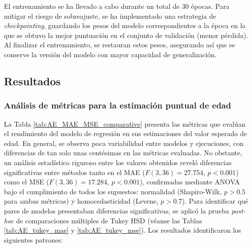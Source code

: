 El entrenamiento se ha llevado a cabo durante un total de 30 épocas. Para mitigar el riesgo de sobreajuste, se ha implementado una estrategia de \textit{checkpointing}, guardando los pesos del modelo correspondientes a la época en la que se obtuvo la mejor puntuación en el conjunto de validación (menor pérdida). Al finalizar el entrenamiento, se restauran estos pesos, asegurando así que se conserve la versión del modelo con mayor capacidad de generalización.




\subsection{Resultados}

\subsubsection{Análisis de métricas para la estimación puntual de edad}

La Tabla \ref{tab:AE_MAE_MSE_comparative} presenta las métricas que evalúan el rendimiento del modelo de regresión en sus estimaciones del valor esperado de edad. En general, se observa poca variabilidad entre modelos y ejecuciones, con diferencias de tan solo unas centésimas en las métricas evaluadas. No obstante, un análisis estadístico riguroso entre los valores obtenidos reveló diferencias significativas entre métodos tanto en el MAE ($F(3, 36) = 27.754$, $p < 0.001$) como el MSE ($F(3, 36) = 17.284$, $p < 0.001$), confirmadas mediante ANOVA bajo el cumplimiento de todos los supuestos: normalidad (Shapiro-Wilk, $p > 0.5$ para ambas métricas) y homocedasticidad (Levene, $p>0.7$). Para identificar qué pares de modelos presentaban diferencias significativas, se aplicó la prueba \textit{post-hoc} de comparaciones múltiples de Tukey HSD
(véanse las Tablas \ref{tab:AE_tukey_mae} y \ref{tab:AE_tukey_mse}). Los resultados identificaron los siguientes patrones:

